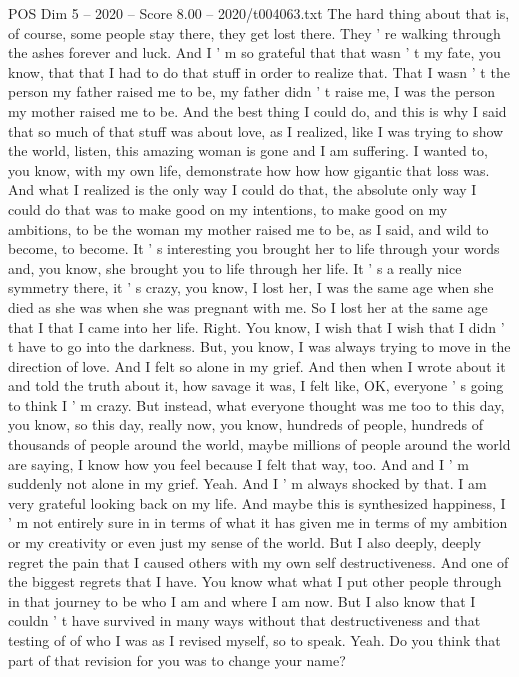 \begin{textsample}{POS Dim 5 – 2020 – Score 8.00 – 2020/t004063.txt}
The hard thing about that is, of course, some people stay there, they get lost there.
They ' re walking through the ashes forever and luck.
And I ' m so grateful that that wasn ' t my fate, you know, that that I had to do that stuff in order to realize that.
That I wasn ' t the person my father raised me to be, my father didn ' t raise me, I was the person my mother raised me to be.
And the best thing I could do, and this is why I said that so much of that stuff was about love, as I realized, like I was trying to show the world, listen, this amazing woman is gone and I am suffering.
I wanted to, you know, with my own life, demonstrate how how how gigantic that loss was.
And what I realized is the only way I could do that, the absolute only way I could do that was to make good on my intentions, to make good on my ambitions, to be the woman my mother raised me to be, as I said, and wild to become, to become.
It ' s interesting you brought her to life through your words and, you know, she brought you to life through her life.
It ' s a really nice symmetry there, it ' s crazy, you know, I lost her, I was the same age when she died as she was when she was pregnant with me.
So I lost her at the same age that I that I came into her life.
Right.
You know, I wish that I wish that I didn ' t have to go into the darkness.
But, you know, I was always trying to move in the direction of love.
And I felt so alone in my grief.
And then when I wrote about it and told the truth about it, how savage it was, I felt like, OK, everyone ' s going to think I ' m crazy.
But instead, what everyone thought was me too to this day, you know, so this day, really now, you know, hundreds of people, hundreds of thousands of people around the world, maybe millions of people around the world are saying, I know how you feel because I felt that way, too.
And and I ' m suddenly not alone in my grief.
Yeah.
And I ' m always shocked by that.
I am very grateful looking back on my life.
And maybe this is synthesized happiness, I ' m not entirely sure in in terms of what it has given me in terms of my ambition or my creativity or even just my sense of the world.
But I also deeply, deeply regret the pain that I caused others with my own self destructiveness.
And one of the biggest regrets that I have.
You know what what I put other people through in that journey to be who I am and where I am now.
But I also know that I couldn ' t have survived in many ways without that destructiveness and that testing of of who I was as I revised myself, so to speak.
Yeah.
Do you think that part of that revision for you was to change your name?

\end{textsample}
